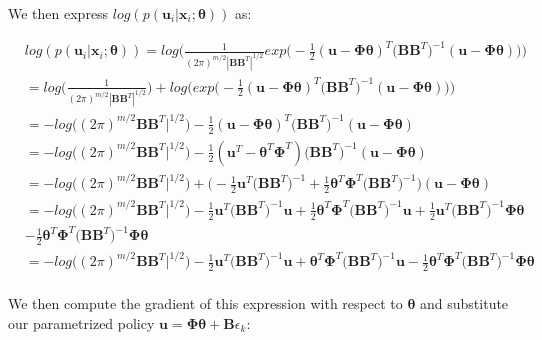 \documentclass[11pt]{homework}
\renewcommand{\vec}[1]{\ensuremath{\boldsymbol{#1}}}
\begin{document}
\begin{arabicparts}
	We then express $log(p(\vec{u}_{i}|\vec{x}_{i};\vec{\theta}))$ as: 
	
	\begin{align*}
		&  log(p(\vec{u}_{i}|\vec{x}_{i};\vec{\theta})) = log\Bigg(  \frac{1}{(2\pi)^{m/2}| \vec{B}\vec{B}^{T}|^{1/2}}exp\Big( -\frac{1}{2}(\vec{u} - \vec{\Phi}\vec{\theta})^{T}\Big(\vec{B}\vec{B}^T\Big)^{-1}(\vec{u}-\vec{\Phi}\vec{\theta})  \Big)    \Bigg) \\
		& = log\Bigg( \frac{1}{(2\pi)^{m/2}| \vec{B}\vec{B}^{T}|^{1/2}} \Bigg) + log\Bigg( exp\Big( -\frac{1}{2}(\vec{u} - \vec{\Phi}\vec{\theta})^{T}\Big(\vec{B}\vec{B}^T\Big)^{-1}(\vec{u}-\vec{\Phi}\vec{\theta})  \Big)  \Bigg)\\
		& = -log\Big( (2\pi)^{m/2}\vec{B}\vec{B}^{T}|^{1/2} \Big) - \frac{1}{2}(\vec{u} - \vec{\Phi}\vec{\theta})^{T}\Big(\vec{B}\vec{B}^T\Big)^{-1}(\vec{u}-\vec{\Phi}\vec{\theta}) \\
		& = -log\Big( (2\pi)^{m/2}\vec{B}\vec{B}^{T}|^{1/2} \Big) - \frac{1}{2}(\vec{u}^{T} -\vec{\theta}^{T} \vec{\Phi}^{T})\Big(\vec{B}\vec{B}^T\Big)^{-1}(\vec{u}-\vec{\Phi}\vec{\theta}) \\
		& = -log\Big( (2\pi)^{m/2}\vec{B}\vec{B}^{T}|^{1/2} \Big) + \Bigg(-\frac{1}{2}\vec{u}^{T}\Big(\vec{B}\vec{B}^T\Big)^{-1}  + \frac{1}{2}\vec{\theta}^{T}\vec{\Phi}^{T}\Big(\vec{B}\vec{B}^T\Big)^{-1}\Bigg)(\vec{u}-\vec{\Phi}\vec{\theta}) \\
		& = -log\Big( (2\pi)^{m/2}\vec{B}\vec{B}^{T}|^{1/2} \Big)  -\frac{1}{2}\vec{u}^{T}\Big(\vec{B}\vec{B}^T\Big)^{-1}\vec{u}	+ \frac{1}{2}\vec{\theta}^{T}\vec{\Phi}^{T}\Big(\vec{B}\vec{B}^T\Big)^{-1}\vec{u} + \frac{1}{2}\vec{u}^{T}\Big(\vec{B}\vec{B}^T\Big)^{-1}\vec{\Phi}\vec{\theta} \\
		& - \frac{1}{2}\vec{\theta}^{T}\vec{\Phi}^{T}\Big(\vec{B}\vec{B}^T\Big)^{-1}\vec{\Phi}\vec{\theta} \\
		& = -log\Big( (2\pi)^{m/2}\vec{B}\vec{B}^{T}|^{1/2} \Big)  -\frac{1}{2}\vec{u}^{T}\Big(\vec{B}\vec{B}^T\Big)^{-1}\vec{u} + \vec{\theta}^{T}\vec{\Phi}^{T}\Big(\vec{B}\vec{B}^T\Big)^{-1}\vec{u} - \frac{1}{2}\vec{\theta}^{T}\vec{\Phi}^{T}\Big(\vec{B}\vec{B}^T\Big)^{-1}\vec{\Phi}\vec{\theta} \\
	\end{align*}
	
	We then compute the gradient of this expression with respect to $\vec{\theta}$ and substitute our parametrized policy $\vec{u} = \vec{\Phi}\vec{\theta} + \vec{B}\epsilon_{k}$:
	

\end{arabicparts}
\end{document}
